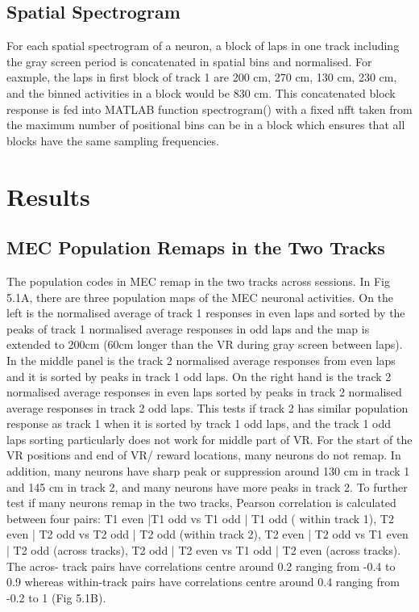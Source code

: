 \subsection{Spatial Spectrogram}
For each spatial spectrogram of a neuron, a block of laps in one track including the gray screen period is concatenated in spatial bins and normalised. For eaxmple, the laps in first block of track 1 are 200 cm, 270 cm, 130 cm, 230 cm, and the binned activities in a block would be 830 cm. This concatenated block response is fed into MATLAB function spectrogram() with a fixed nfft taken from the maximum number of positional bins can be in a block which ensures that all blocks have the same sampling frequencies.


\section{Results}
\subsection{MEC Population Remaps in the Two Tracks}
The population codes in MEC remap in the two tracks across sessions. In Fig 5.1A, there are three population maps of the MEC neuronal activities. On the left is the normalised average of track 1 responses in even laps and sorted by the peaks of track 1 normalised average responses in odd laps and the map is extended to 200cm (60cm longer than the VR during gray screen between laps). In the middle panel is the track 2 normalised average responses from even laps and it is sorted by peaks in track 1 odd laps. On the right hand is the track 2 normalised average responses in even laps sorted by peaks in track 2 normalised average responses in track 2 odd laps. This tests if track 2 has similar population response as track 1 when it is sorted by track 1 odd laps, and the track 1 odd laps sorting particularly does not work for middle part of VR. For the start of the VR positions and end of VR/ reward locations, many neurons do not remap. In addition, many neurons have sharp peak or suppression around 130 cm in track 1 and 145 cm in track 2, and many neurons have more peaks in track 2. To further test if many neurons remap in the two tracks, Pearson correlation is calculated between four pairs: T1 even |T1 odd vs T1 odd | T1 odd ( within track 1), T2 even | T2 odd vs T2 odd | T2 odd (within track 2), T2 even | T2 odd vs T1 even | T2 odd (across tracks), T2 odd | T2 even vs T1 odd | T2 even (across tracks). The acros- track pairs have correlations centre around 0.2 ranging from -0.4 to 0.9 whereas within-track pairs have correlations centre around 0.4 ranging from -0.2 to 1 (Fig 5.1B).


